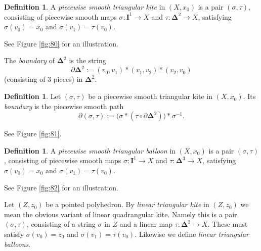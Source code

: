 \documentclass[10pt, a4paper]{amsart}
\theoremstyle{definition}
\newtheorem{dfn}[equation]{Definition}
\numberwithin{equation}{section}
\newcommand{\mbf}[1]{\mathbf{#1}}
\newcommand{\bsym}[1]{\boldsymbol{#1}}
\newcommand{\lb}{\linebreak}
\begin{document}
\begin{dfn}
A {\em piecewise smooth triangular kite}
in $(X, x_0)$ is a pair 
$(\sigma, \tau)$, consisting of piecewise smooth maps
$\sigma : \mbf{I}^1 \to X$ and
$\tau : \bsym{\Delta}^2 \to X$, 
satisfying $\sigma(v_0) = x_0$ and
$\sigma(v_1) = \tau(v_0)$.
\end{dfn}

See Figure \ref{fig:80} for an illustration.

The {\em boundary} of $\bsym{\Delta}^2$ is the string
\begin{equation} \label{eqn:160}
\partial \bsym{\Delta}^2 := (v_0, v_1) * (v_1, v_2) * (v_2, v_0) 
\end{equation}
(consisting of $3$ pieces) in $\bsym{\Delta}^2$.

\begin{dfn} \label{dfn:31}
Let $(\sigma, \tau)$ be a piecewise smooth triangular kite in \lb $(X, x_0)$. 
Its {\em boundary} is the piecewise smooth path
\[ \partial (\sigma, \tau) := \bigl( \sigma * 
(\tau \circ \partial \bsym{\Delta}^2) \bigr) * \sigma^{-1} . \]
\end{dfn}

See Figure \ref{fig:81}.

\begin{dfn}
A {\em piecewise smooth triangular balloon} 
in $(X, x_0)$ is a pair 
$(\sigma, \tau)$, consisting of piecewise smooth maps
$\sigma : \mbf{I}^1 \to X$ and
$\tau : \bsym{\Delta}^3 \to X$, 
satisfying $\sigma(v_0) = x_0$ and
$\sigma(v_1) = \tau(v_0)$.
\end{dfn}

See Figure \ref{fig:82} for an illustration.

Let $(Z, z_0)$ be a pointed polyhedron. 
By {\em linear triangular kite} in $(Z, z_0)$ we mean the obvious variant of
linear quadrangular kite. Namely this is a pair 
$(\sigma, \tau)$, consisting of a string $\sigma$ in $Z$ and a linear map
$\tau : \bsym{\Delta}^3 \to X$. These must satisfy 
$\sigma(v_0) = z_0$ and
$\sigma(v_1) = \tau(v_0)$.
Likewise we define {\em linear triangular balloons}.
\end{document}
